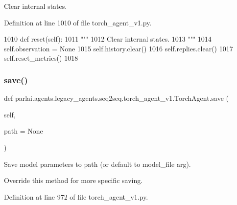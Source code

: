 \begin{DoxyVerb}Clear internal states.
\end{DoxyVerb}
 

Definition at line 1010 of file torch\+\_\+agent\+\_\+v1.\+py.


\begin{DoxyCode}
1010     \textcolor{keyword}{def }reset(self):
1011         \textcolor{stringliteral}{"""}
1012 \textcolor{stringliteral}{        Clear internal states.}
1013 \textcolor{stringliteral}{        """}
1014         self.observation = \textcolor{keywordtype}{None}
1015         self.history.clear()
1016         self.replies.clear()
1017         self.reset\_metrics()
1018 
\end{DoxyCode}
\mbox{\label{classparlai_1_1agents_1_1legacy__agents_1_1seq2seq_1_1torch__agent__v1_1_1TorchAgent_a4a01defa1d669571f574fcfe021776a8}} 
\subsubsection{\texorpdfstring{save()}{save()}}
{\footnotesize\ttfamily def parlai.\+agents.\+legacy\+\_\+agents.\+seq2seq.\+torch\+\_\+agent\+\_\+v1.\+Torch\+Agent.\+save (\begin{DoxyParamCaption}\item[{}]{self,  }\item[{}]{path = {\ttfamily None} }\end{DoxyParamCaption})}

\begin{DoxyVerb}Save model parameters to path (or default to model_file arg).

Override this method for more specific saving.
\end{DoxyVerb}
 

Definition at line 972 of file torch\+\_\+agent\+\_\+v1.\+py.


